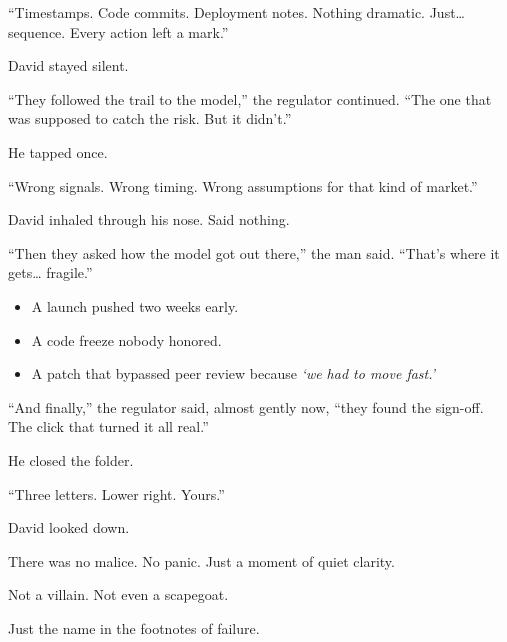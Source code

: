 “Timestamps. Code commits. Deployment notes. Nothing dramatic. Just… sequence. Every action left a mark.”

David stayed silent.

“They followed the trail to the model,” the regulator continued. “The one that was supposed to catch the risk. But it didn’t.”

He tapped once.

“Wrong signals. Wrong timing. Wrong assumptions for that kind of market.”

David inhaled through his nose. Said nothing.

“Then they asked how the model got out there,” the man said. “That’s where it gets… fragile.”

\begin{itemize}
\item A launch pushed two weeks early.
\item A code freeze nobody honored.
\item A patch that bypassed peer review because \textit{‘we had to move fast.’}
\end{itemize}

“And finally,” the regulator said, almost gently now, “they found the sign-off. The click that turned it all real.”

He closed the folder.

“Three letters. Lower right. Yours.”

David looked down.

There was no malice. No panic. Just a moment of quiet clarity.

Not a villain. Not even a scapegoat.

Just the name in the footnotes of failure.

\medskip

